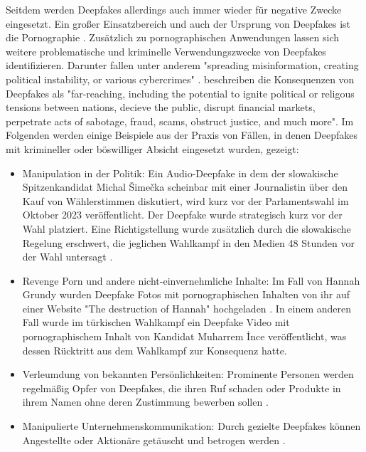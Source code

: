 Seitdem werden Deepfakes allerdings auch immer wieder für negative Zwecke eingesetzt. 
Ein großer Einsatzbereich und auch der Ursprung von Deepfakes ist die Pornographie \autocite{ajderDeeptraceLabReport}. 
Zusätzlich zu pornographischen Anwendungen lassen sich weitere problematische und kriminelle Verwendungszwecke von Deepfakes identifizieren. 
Darunter fallen unter anderem "spreading misinformation, creating political instability, or various cybercrimes" \cite[S.2]{ranaDeepfakeDetectionSystematic2022}. 
\textcite{gambinDeepfakesCurrentFuture2024} beschreiben die Konsequenzen von Deepfakes als "far-reaching, 
including the potential to ignite political or religous tensions between nations, decieve the public, disrupt financial markets, 
perpetrate acts of sabotage, fraud, scams, obstruct justice, and much more"\cite[S.3]{gambinDeepfakesCurrentFuture2024}.
Im Folgenden werden einige Beispiele aus der Praxis von Fällen, in denen Deepfakes mit krimineller oder böswilliger Absicht eingesetzt wurden, gezeigt:
\begin{itemize}
    \item Manipulation in der Politik: Ein Audio-Deepfake in dem der slowakische Spitzenkandidat Michal Šimečka scheinbar mit einer 
        Journalistin über den Kauf von Wählerstimmen diskutiert, wird kurz vor der Parlamentswahl im Oktober 2023 veröffentlicht. 
        Der Deepfake wurde strategisch kurz vor der Wahl platziert. 
        Eine Richtigstellung wurde zusätzlich durch die slowakische Regelung erschwert, 
        die jeglichen Wahlkampf in den Medien 48 Stunden vor der Wahl untersagt \cite{pawelecPolitischeManipulationUnd2024}.
    \item Revenge Porn und andere nicht-einvernehmliche Inhalte: 
        Im Fall von Hannah Grundy wurden Deepfake Fotos mit pornographischen Inhalten von ihr auf einer Website "The destruction of Hannah" hochgeladen \autocite{WomansDeepfakeBetrayal2025}.
        In einem anderen Fall wurde im türkischen Wahlkampf ein Deepfake Video mit pornographischem Inhalt von Kandidat Muharrem İnce veröffentlicht, 
        was dessen Rücktritt aus dem Wahlkampf zur Konsequenz hatte. \cite{TurkishPresidentialCandidate2023}
    \item Verleumdung von bekannten Persönlichkeiten: Prominente Personen werden regelmäßig Opfer von Deepfakes, 
        die ihren Ruf schaden oder Produkte in ihrem Namen ohne deren Zustimmung bewerben sollen \cite{PDFImpactDeepfake2025}.
    \item Manipulierte Unternehmenskommunikation: Durch gezielte Deepfakes können Angestellte oder Aktionäre getäuscht und betrogen werden \cite{PDFImpactDeepfake2025}.
\end{itemize}
